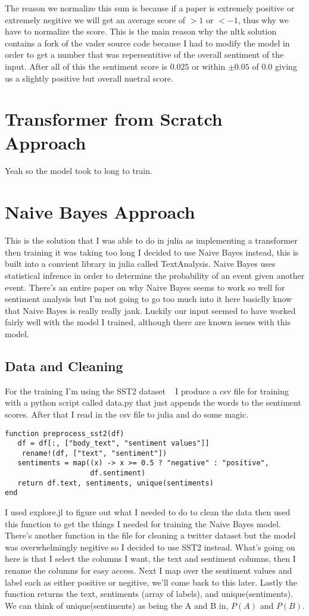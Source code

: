 \documentclass[12pt]{article}
\begin{document}
The reason we normalize this sum is because if a paper is extremely positive 
or extremely negitive we will get an average score of $>1$ or $<-1$, thus why we
have to normalize the score. This is the main reason why the nltk solution
contains a fork of the vader source code because I had to modify the model in order
to get a number that was repersentitive of the overall sentiment of the input.
After all of this the sentiment score is $0.025$ or within $\pm0.05$ of $0.0$ giving
us a slightly positive but overall nuetral score.

\newpage
\section{Transformer from Scratch Approach}
Yeah so the model took to long to train.

\newpage
\section{Naive Bayes Approach}
This is the solution that I was able to do in julia as implementing a transformer then training it was taking too long I decided
to use Naive Bayes instead, this is built into a convient library in julia called TextAnalysis. Naive Bayes uses statistical infrence 
in order to determine the probability of an event given another event. There's an entire paper on why Naive Bayes seems to work
so well for sentiment analysis but I'm not going to go too much into it here basiclly know that Naive Bayes is really 
really jank. Luckily our input seemed to have worked fairly well with the model I trained, although there are known issues with
this model.
\subsection{Data and Cleaning}
For the training I'm using the SST2 dataset ~\cite{} %
I produce a csv file for training with a python script called data.py that just appends the words to the sentiment scores.
After that I read in the csv file to julia and do some magic.
\begin{verbatim}
function preprocess_sst2(df)
   df = df[:, ["body_text", "sentiment values"]]
	rename!(df, ["text", "sentiment"])
   sentiments = map((x) -> x >= 0.5 ? "negative" : "positive",
                    df.sentiment)
   return df.text, sentiments, unique(sentiments)
end
\end{verbatim}
I used explore.jl to figure out what I needed to do to clean the data then used this function to get the things I needed for training
the Naive Bayes model. There's another function in the file for cleaning a twitter dataset but the model was overwhelmingly negitive
so I decided to use SST2 instead. What's going on here is that I select the columns I want, the text and sentiment columns, then I
rename the columns for easy access. Next I map over the sentiment values and label each as either positive or negitive, we'll come
back to this later. Lastly the function returns the text, sentiments (array of labels), and unique(sentiments). We can think of
unique(sentiments) as being the A and B in, $P(A)$ and $P(B)$.
\end{document}
